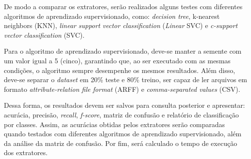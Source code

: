 \par De modo a comparar os extratores, serão realizados alguns testes com diferentes algoritmos de aprendizado supervisionado, como: \textit{decision tree}, k-nearest neighbors (KNN), \textit{linear support vector classification} (\textit{Linear} SVC) e \textit{c-support vector classification} (SVC).

\par Para o algoritmo de aprendizado supervisionado, deve-se manter a semente com um valor igual a 5 (cinco), garantindo que, ao ser executado com as mesmas condições, o algoritmo sempre desempenhe os mesmos resultados. Além disso, deve-se separar o \textit{dataset} em 20\% teste e 80\% treino, ser capaz de ler arquivos em formato \textit{attribute-relation file format} (ARFF) e \textit{comma-separated values} (CSV).

\par Dessa forma, os resultados devem ser salvos para consulta posterior e apresentar: acurácia, precisão, \textit{recall}, \textit{f-score}, matriz de confusão e relatório de classificação por classes. Assim, as acurácias obtidas pelos extratores serão comparadas quando testados com diferentes algoritmos de aprendizado supervisionado, além da análise da matriz de confusão. Por fim, será calculado o tempo de execução dos extratores.

